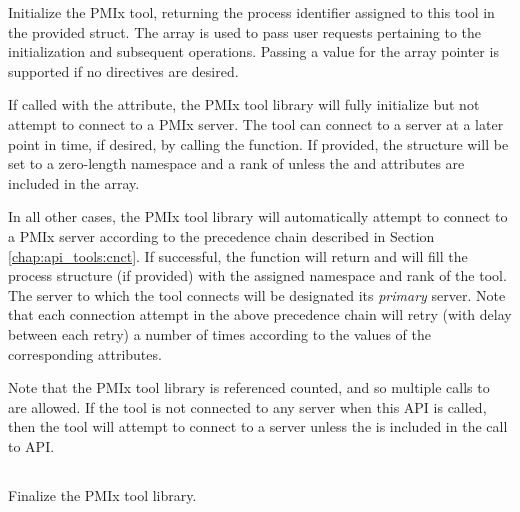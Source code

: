 {\optattrend

\descr

Initialize the \ac{PMIx} tool, returning the process identifier assigned to this tool in the provided  struct. The  array is used to pass user requests pertaining to the initialization and subsequent operations. Passing a  value for the array pointer is supported if no directives are desired.

If called with the  attribute, the \ac{PMIx} tool library will fully initialize but not attempt to connect to a \ac{PMIx} server. The tool can connect to a server at a later point in time, if desired, by calling the  function. If provided, the  structure will be set to a zero-length namespace and a rank of  unless the  and  attributes are included in the  array.

In all other cases, the \ac{PMIx} tool library will automatically attempt to connect to a \ac{PMIx} server according to the precedence chain described in Section \ref{chap:api_tools:cnct}. If successful, the function will return  and will fill the process structure (if provided) with the assigned namespace and rank of the tool. The server to which the tool connects will be designated its \emph{primary} server. Note that each connection attempt in the above precedence chain will retry (with delay between each retry) a number of times according to the values of the corresponding attributes.

Note that the \ac{PMIx} tool library is referenced counted, and so multiple calls to  are allowed. If the tool is not connected to any server when this \ac{API} is called, then the tool will attempt to connect to a server unless the  is included in the call to \ac{API}.


\subsection{}

\summary

Finalize the \ac{PMIx} tool library.

\format

}

